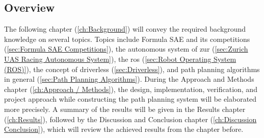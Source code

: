 \subsection{Overview} \label{sec:Overview}
The following chapter (\ref{ch:Background}) will convey the required background knowledge on several topics. Topics include Formula SAE and its competitions (\ref{sec:Formula SAE Competitions}), the autonomous system of \acrlong{zur} (\ref{sec:Zurich UAS Racing Autonomous System}), the \acrlong{ros} (\ref{sec:Robot Operating System (ROS)}), the concept of driverless (\ref{sec:Driverless}), and path planning algorithms in general (\ref{sec:Path Planning Algorithms}). During the Approach and Methods chapter (\ref{ch:Approach / Methods}), the design, implementation, verification, and project approach while constructing the path planning system will be elaborated more precisely. A summary of the results will be given in the Results chapter (\ref{ch:Results}), followed by the Discussion and Conclusion chapter (\ref{ch:Discussion Conclusion}), which will review the achieved results from the chapter before.
